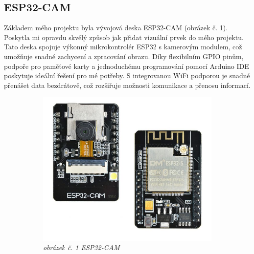 \documentclass[12pt, a4paper,
oneside,      %
openany
]{report}
\begin{document}
\subsection{ESP32-CAM}
\noindent Základem mého projektu byla vývojová deska ESP32-CAM (obrázek č. 1). Poskytla mi opravdu skvělý způsob jak přidat vizuální prvek do mého projektu. Tato deska spojuje výkonný mikrokontrolér ESP32 s kamerovým modulem, což umožňuje snadné zachycení a zpracování obrazu. Díky flexibilním GPIO pinům, podpoře pro paměťové karty a jednoduchému programování pomocí Arduino IDE poskytuje ideální řešení pro mé potřeby. S integrovanou WiFi podporou je snadné přenášet data bezdrátově, což rozšiřuje možnosti komunikace a přenosu informací.
\begin{figure}[h]
    \begin{subfigure}{0.48\textwidth}
        \centering
		\includegraphics[width=\textwidth]{image/esp32.png}
        \caption*{\textit{obrázek č. 1 ESP32-CAM}}
        \label{fig:esp32}
    \end{subfigure}
    \begin{subfigure}{0.48\textwidth}
        \centering

\end{subfigure}
\end{figure}
\end{document}
